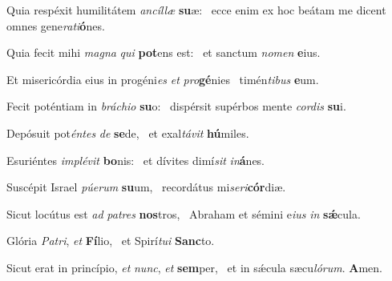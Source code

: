 \item Quia respéxit humilitátem \textit{ancíllæ} \textbf{su}æ:~\psstar{} ecce enim ex hoc beátam me dicent omnes gene\textit{rati}\textbf{ó}nes.

\item Quia fecit mihi \textit{magna} \textit{qui} \textbf{pot}ens est:~\psstar{} et sanctum \textit{nomen} \textbf{e}ius.

\item Et misericórdia eius in progéni\textit{es} \textit{et} \textit{pro}\textbf{gé}nies~\psstar{} timén\textit{tibus} \textbf{e}um.

\item Fecit poténtiam in \textit{bráchio} \textbf{su}o:~\psstar{} dispérsit supérbos mente \textit{cordis} \textbf{su}i.

\item Depósuit pot\textit{éntes} \textit{de} \textbf{se}de,~\psstar{} et exal\textit{távit} \textbf{hú}miles.

\item Esuriéntes \textit{implévit} \textbf{bo}nis:~\psstar{} et dívites dimí\textit{sit} \textit{in}\textbf{á}nes.

\item Suscépit Israel \textit{púerum} \textbf{su}um,~\psstar{} recordátus mi\textit{seri}\textbf{cór}diæ.

\item Sicut locútus est \textit{ad} \textit{patres} \textbf{nos}tros,~\psstar{} Abraham et sémini e\textit{ius} \textit{in} \textbf{sǽ}cula.

\item Glória \textit{Patri}, \textit{et} \textbf{Fí}lio,~\psstar{} et Spirí\textit{tui} \textbf{Sanc}to.

\item Sicut erat in princípio, \textit{et} \textit{nunc}, \textit{et} \textbf{sem}per,~\psstar{} et in sǽcula sæcu\textit{lórum}. \textbf{A}men.